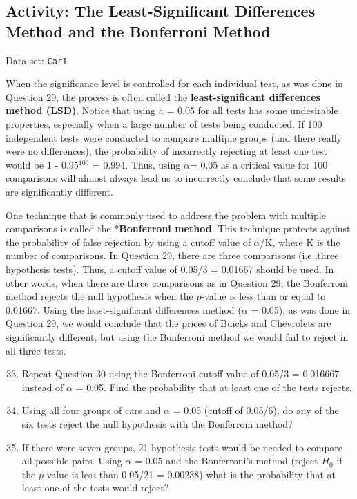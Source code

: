 \documentclass[
]{book}
\begin{document}
\hypertarget{activity-the-least-significant-differences-method-and-the-bonferroni-method}{%
\subsection*{Activity: The Least-Significant Differences Method and the Bonferroni Method}\label{activity-the-least-significant-differences-method-and-the-bonferroni-method}}

Data set: \texttt{Car1}

When the significance level is controlled for each individual test, as was done in Question 29, the process is often called the \textbf{least-significant differences method (LSD)}. Notice that using a = 0.05 for all tests has some undesirable properties, especially when a large number of tests being conducted. If 100 independent tests were conducted to compare multiple groups (and there really were no differences), the probability of incorrectly rejecting at least one test would be 1 - 0.95\(^{100}\) = 0.994. Thus, using \(\alpha\)= 0.05 as a critical value for 100 comparisons will almost always lead us to incorrectly conclude that some results are significantly different.

One technique that is commonly used to address the problem with multiple comparisons is called the *\textbf{Bonferroni method}. This technique protects against the probability of false rejection by using a cutoff value of \(\alpha\)/K, where K is the number of comparisons. In Question 29, there are three comparisons (i.e.,three hypothesis tests). Thus, a cutoff value of 0.05/3 = 0.01667 should be used. In other words, when there are three comparisons as in Question 29, the Bonferroni method rejects the null hypothesis when the \(p\)-value is less than or equal to 0.01667. Using the least-significant differences method (\(\alpha\) = 0.05), as was done in Question 29, we would conclude that the prices of Buicks and Chevrolets are significantly different, but using the Bonferroni method we would fail to reject in all three tests.

\begin{enumerate}
  \setcounter{enumi}{32}
  \item Repeat Question 30 using the Bonferroni cutoff value of 0.05/3 = 0.016667 instead of $\alpha$ = 0.05. Find the probability that at least one of the tests rejects.
  \item Using all four groups of cars and $\alpha$ = 0.05 (cutoff of 0.05/6), do any of the six tests reject the null hypothesis with the Bonferroni method?
  \item If there were seven groups, 21 hypothesis tests would be needed to compare all possible pairs. Using $\alpha$ = 0.05 and the Bonferroni’s method (reject $H_0$ if the $p$-value is less than 0.05/21 = 0.00238) what is the probability that at least one of the tests would reject?
\end{enumerate}
\end{document}
